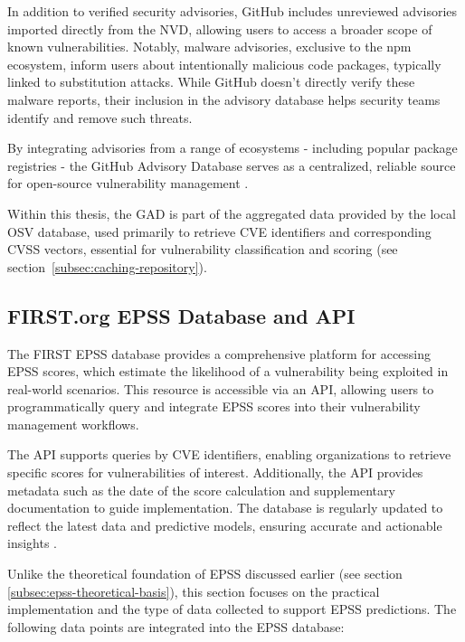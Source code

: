 In addition to verified security advisories, GitHub includes unreviewed advisories imported directly from the \ac{NVD}, allowing users to access a broader scope of known vulnerabilities. Notably, malware advisories, exclusive to the npm ecosystem, inform users about intentionally malicious code packages, typically linked to substitution attacks. While GitHub doesn’t directly verify these malware reports, their inclusion in the advisory database helps security teams identify and remove such threats.

By integrating advisories from a range of ecosystems  -  including popular package registries  -  the GitHub Advisory Database serves as a centralized, reliable source for open-source vulnerability management \autocite{github_inc_about_2024}.

Within this thesis, the \ac{GAD} is part of the aggregated data provided by the local \ac{OSV} database, used primarily to retrieve \ac{CVE} identifiers and corresponding \ac{CVSS} vectors, essential for vulnerability classification and scoring (see section~\ref{subsec:caching-repository}).

\subsection{FIRST.org EPSS Database and API}
\label{subsec:first-epss-database}

The \ac{FIRST} \ac{EPSS} database provides a comprehensive platform for accessing \ac{EPSS} scores, which estimate the likelihood of a vulnerability being exploited in real-world scenarios. This resource is accessible via an \ac{API}, allowing users to programmatically query and integrate \ac{EPSS} scores into their vulnerability management workflows.

The \ac{API} supports queries by \ac{CVE} identifiers, enabling organizations to retrieve specific scores for vulnerabilities of interest. Additionally, the \ac{API} provides metadata such as the date of the score calculation and supplementary documentation to guide implementation. The database is regularly updated to reflect the latest data and predictive models, ensuring accurate and actionable insights \cite{first_epss_2024}.

Unlike the theoretical foundation of \ac{EPSS} discussed earlier (see section \ref{subsec:epss-theoretical-basis}), this section focuses on the practical implementation and the type of data collected to support \ac{EPSS} predictions. The following data points are integrated into the \ac{EPSS} database:

